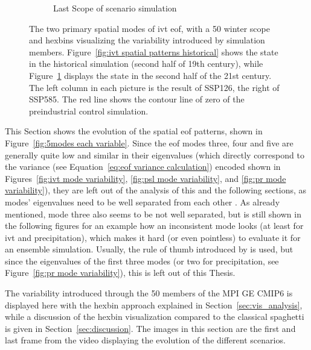 \begin{figure}[!htb]
\begin{subfigure}[b]{0.49\textwidth}
    \caption{Last Scope of scenario simulation}
    \label{fig:ivt spatial patterns endscenario}
  \end{subfigure}
  \caption{The two primary spatial modes of \ac{ivt} \ac{eof}, with a 50 winter scope and hexbins visualizing the variability introduced by simulation members. Figure~\ref{fig:ivt spatial patterns historical} shows the state in the historical simulation (second half of 19th century), while Figure~\ref{fig:ivt spatial patterns endscenario} displays the state in the second half of the 21st century. The left column in each picture is the result of SSP126, the right of SSP585. The red line shows the contour line of zero of the preindustrial control simulation. }\label{fig:ivt eof evolution}
\end{figure}

This Section shows the evolution of the spatial \ac{eof} patterns, shown in Figure~\ref{fig:5modes each variable}. 
Since the \ac{eof} modes three, four and five are generally quite low and similar in their eigenvalues (which directly correspond to the variance (see Equation~\ref{eq:eof variance calculation}) encoded shown in Figures~\ref{fig:ivt mode variability}, \ref{fig:psl mode variability}, and \ref{fig:pr mode variability}), they are left out of the analysis of this and the following sections, as modes' eigenvalues need to be well separated from each other \cite{hannachi_empirical_2007}. 
As already mentioned, mode three also seems to be not well separated, but is still shown in the following figures for an example how an inconsistent mode looks (at least for \ac{ivt} and precipitation), which makes it hard (or even pointless) to evaluate it for an ensemble simulation.  
Usually, the rule of thumb introduced by  is used, but since the eigenvalues of the first three modes (or two for precipitation, see Figure~\ref{fig:pr mode variability}), this is left out of this Thesis. 

The variability introduced through the 50 members of the MPI GE CMIP6 is displayed here with the hexbin approach explained in Section~\ref{sec:vis_analysis}, while a discussion of the hexbin visualization compared to the classical spaghetti is given in Section~\ref{sec:discussion}.
The images in this section are the first and last frame from the video displaying the evolution of the different scenarios.  


